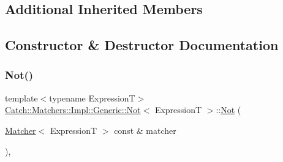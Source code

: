\subsection*{Additional Inherited Members}


\subsection{Constructor \& Destructor Documentation}
\hypertarget{class_catch_1_1_matchers_1_1_impl_1_1_generic_1_1_not_a9b99e3ce49c1a16931708b67c312f204}{}\label{class_catch_1_1_matchers_1_1_impl_1_1_generic_1_1_not_a9b99e3ce49c1a16931708b67c312f204} 
\subsubsection{\texorpdfstring{Not()}{Not()}\hspace{0.1cm}{\footnotesize\ttfamily [1/2]}}
{\footnotesize\ttfamily template$<$typename ExpressionT$>$ \\
\hyperlink{class_catch_1_1_matchers_1_1_impl_1_1_generic_1_1_not}{Catch\+::\+Matchers\+::\+Impl\+::\+Generic\+::\+Not}$<$ ExpressionT $>$\+::\hyperlink{class_catch_1_1_matchers_1_1_impl_1_1_generic_1_1_not}{Not} (\begin{DoxyParamCaption}\item[{\hyperlink{struct_catch_1_1_matchers_1_1_impl_1_1_matcher}{Matcher}$<$ ExpressionT $>$ const \&}]{matcher }\end{DoxyParamCaption})\hspace{0.3cm}{\ttfamily [inline]}, {\ttfamily [explicit]}}

\hypertarget{class_catch_1_1_matchers_1_1_impl_1_1_generic_1_1_not_a46eccbbaeec259d3536aa2a29f95208f}{}\label{class_catch_1_1_matchers_1_1_impl_1_1_generic_1_1_not_a46eccbbaeec259d3536aa2a29f95208f} 
